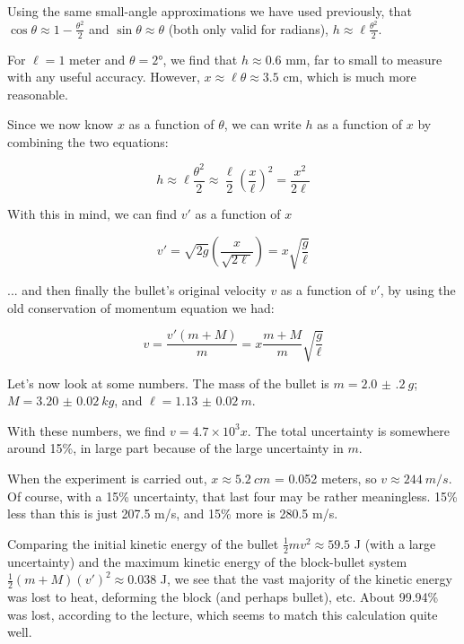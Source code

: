 Using the same small-angle approximations we have used previously, that $\displaystyle \cos \theta \approx 1 - \frac{\theta^2}{2}$ and $\sin \theta \approx \theta$ (both only valid for radians), $\displaystyle h \approx \ell \frac{\theta^2}{2}$.

For $\ell = 1$ meter and $\theta = \ang{2}$, we find that $h \approx 0.6$ mm, far to small to measure with any useful accuracy. However, $x \approx \ell \theta \approx 3.5$ cm, which is much more reasonable. 

Since we now know $x$ as a function of $\theta$, we can write $h$ as a function of $x$ by combining the two equations:

\begin{equation}
h \approx \ell \frac{\theta^2}{2} \approx \frac{\ell}{2} \left(\frac{x}{\ell}\right)^2 = \frac{x^2}{2 \ell}
\end{equation}

With this in mind, we can find $v'$ as a function of $x$

\begin{equation}
v' = \sqrt{2 g} (\frac{x}{\sqrt{2 \ell}}) = x \sqrt{\frac{g}{\ell}}
\end{equation}

... and then finally the bullet's original velocity $v$ as a function of $v'$, by using the old conservation of momentum equation we had:

\begin{equation}
v = \frac{v'(m + M)}{m} = x \frac{m + M}{m} \sqrt{\frac{g}{\ell}}
\end{equation}

Let's now look at some numbers. The mass of the bullet is $m = \SI{2.0(2)}{g}$; $M = \SI{3.20(2)}{kg}$, and $\ell = \SI{1.13(2)}{m}$.

With these numbers, we find $v = 4.7 \times 10^{3} x$. The total uncertainty is somewhere around 15\%, in large part because of the large uncertainty in $m$.

When the experiment is carried out, $x \approx \SI{5.2}{cm}$ = 0.052 meters, so $v \approx \SI{244}{m/s}$. Of course, with a 15\% uncertainty, that last four may be rather meaningless. 15\% less than this is just 207.5 m/s, and 15\% more is 280.5 m/s.

Comparing the initial kinetic energy of the bullet $\displaystyle \frac{1}{2} m v^2 \approx 59.5$ J (with a large uncertainty) and the maximum kinetic energy of the block-bullet system $\displaystyle \frac{1}{2} (m + M) (v')^2 \approx 0.038$ J, we see that the vast majority of the kinetic energy was lost to heat, deforming the block (and perhaps bullet), etc. About 99.94\% was lost, according to the lecture, which seems to match this calculation quite well.

